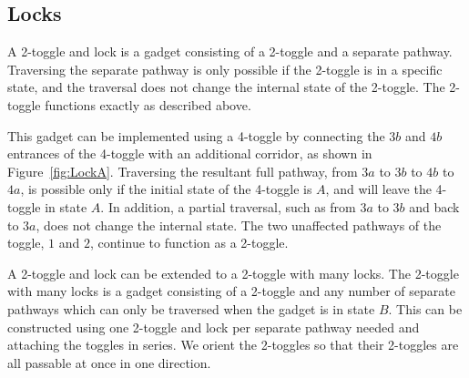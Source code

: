 \subsection{Locks}

A 2-toggle and lock is a gadget consisting of a 2-toggle and a separate pathway. Traversing the separate pathway is only possible if the 2-toggle is in a specific state, and the traversal does not change the internal state of the 2-toggle. The 2-toggle functions exactly as described above.

This gadget can be implemented using a 4-toggle by
connecting the $3b$ and $4b$ entrances of the 4-toggle with an additional corridor, as shown in Figure~\ref{fig:LockA}.
Traversing the resultant full pathway, from $3a$ to $3b$ to $4b$ to $4a$, is possible only if the initial
state of the 4-toggle is $A$, and will leave the 4-toggle in state $A$. In addition, a partial traversal,
such as from $3a$ to $3b$ and back to $3a$, does not change the internal state. The two unaffected
pathways of the toggle, $1$ and $2$, continue to function as a 2-toggle.


A 2-toggle and lock can be extended to a 2-toggle with many locks. The 2-toggle with many locks is a gadget consisting of a 2-toggle and any number of separate pathways which can only be traversed when the gadget is in state $B$. This can be constructed using one 2-toggle and lock per separate pathway needed and attaching the toggles in series.
We orient the 2-toggles so that 
their 2-toggles are all passable at once in one direction.




